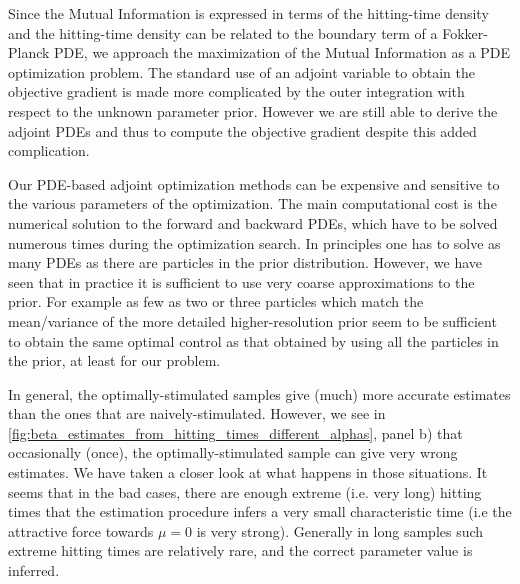 \documentclass{article}
\begin{document}
Since the Mutual Information is expressed in terms of the hitting-time density
and the hitting-time density can be related to the boundary term of a
Fokker-Planck PDE, we approach the maximization of the Mutual Information as a
PDE optimization problem. The standard use of an adjoint variable to obtain the
objective gradient is made more complicated by the outer integration with
respect to the unknown parameter prior. However we are still able to derive the
adjoint PDEs and thus to compute the objective gradient despite this added
complication.
 
Our PDE-based adjoint optimization methods can be expensive and sensitive to the
various parameters of the optimization. The main computational cost is the
numerical solution to the forward and backward PDEs, which have to be solved
numerous times during the optimization search. In principles one has to solve as
many PDEs as there are particles in the prior distribution. However, we have
seen that in practice it is sufficient to use very coarse approximations to the
prior. For example as few as two or three particles which match the
mean/variance of the more detailed higher-resolution prior seem to be sufficient
to obtain the same optimal control as that obtained by using all the particles
in the prior, at least for our problem.
 
In general, the optimally-stimulated samples give (much) more accurate estimates
than the ones that are naively-stimulated. However, we see in
\cref{fig:beta_estimates_from_hitting_times_different_alphas}, panel b) that
occasionally (once), the optimally-stimulated sample can give very wrong
estimates. We have taken a closer look at what happens in those situations. 
It seems that in the bad cases, there are enough extreme (i.e. very long)
hitting times that the estimation procedure infers a very small characteristic
time (i.e the attractive force towards $\mu=0$ is very strong). Generally in
long samples such extreme hitting times are relatively rare, and the correct
parameter value is inferred.
\end{document}
